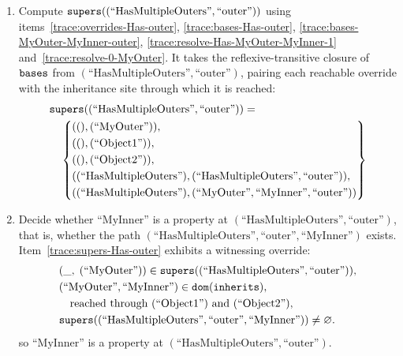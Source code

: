\begin{enumerate}
  \[
    \resolve((), (), 0, (\text{``MyOuter''})) = \{(\text{``MyOuter''})\}
  \]
  \item \label{trace:supers-Has-outer}Compute $\mathtt{supers}((\text{``HasMultipleOuters''}, \text{``outer''}))$ using items~\ref{trace:overrides-Has-outer}, \ref{trace:bases-Has-outer}, \ref{trace:bases-MyOuter-MyInner-outer}, \ref{trace:resolve-Has-MyOuter-MyInner-1} and~\ref{trace:resolve-0-MyOuter}. It takes the reflexive-transitive closure of $\mathtt{bases}$ from $(\text{``HasMultipleOuters''}, \text{``outer''})$, pairing each reachable override with the inheritance site through which it is reached:
  \[
    \begin{aligned}
      &\mathtt{supers}((\text{``HasMultipleOuters''}, \text{``outer''})) ={} \\
      &\quad \left\{\begin{aligned}
          &((), (\text{``MyOuter''})), \\
          &((), (\text{``Object1''})), \\
          &((), (\text{``Object2''})), \\
          &((\text{``HasMultipleOuters''}), (\text{``HasMultipleOuters''}, \text{``outer''})), \\
          &((\text{``HasMultipleOuters''}), (\text{``MyOuter''}, \text{``MyInner''}, \text{``outer''}))
        \end{aligned}\right\}
    \end{aligned}
  \]
  \item \label{trace:property}Decide whether $\text{``MyInner''}$ is a property at $(\text{``HasMultipleOuters''}, \text{``outer''})$, that is, whether the path $(\text{``HasMultipleOuters''}, \text{``outer''}, \text{``MyInner''})$ exists. Item~\ref{trace:supers-Has-outer} exhibits a witnessing override:
  \[
    \begin{aligned}
      &(\_,\; (\text{``MyOuter''})) \in \mathtt{supers}((\text{``HasMultipleOuters''}, \text{``outer''})), \\
      &(\text{``MyOuter''}, \text{``MyInner''}) \in \mathtt{dom}(\mathtt{inherits}), \\
      &\quad \text{reached through } (\text{``Object1''}) \text{ and } (\text{``Object2''}), \\
      &\mathtt{supers}((\text{``HasMultipleOuters''}, \text{``outer''}, \text{``MyInner''})) \neq \varnothing.
    \end{aligned}
  \]
  so $\text{``MyInner''}$ is a property at $(\text{``HasMultipleOuters''}, \text{``outer''})$.
\end{enumerate}
